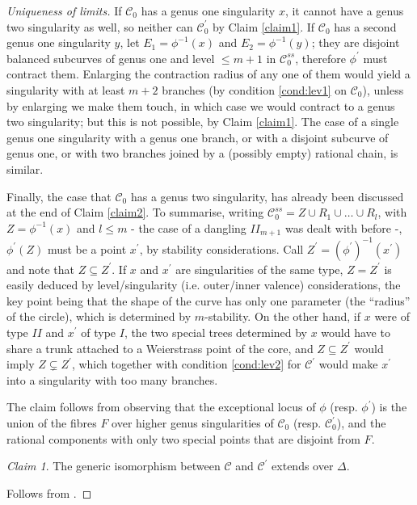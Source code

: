 \documentclass{compositio}
\newcommand{\dvr}{\Delta}
\theoremstyle{plain}
\theoremstyle{definition}
\theoremstyle{remark}
\newtheorem{claim}{Claim}
\begin{document}
\begin{proof}[Uniqueness of limits]
 If $\mathcal C_0$ has a genus one singularity $x$, it cannot have a genus two singularity as well, so neither can $\mathcal C^\prime_0$ by Claim \ref{claim1}. If $\mathcal C_0$ has a second genus one singularity $y$, let $E_1=\phi^{-1}(x)$ and $E_2=\phi^{-1}(y)$; they are disjoint balanced subcurves of genus one and level $\leq m+1$ in $\mathcal C^{ss}_0$, therefore $\phi^\prime$ must contract them. Enlarging the contraction radius of any one of them would yield a singularity with at least $m+2$ branches (by condition \eqref{cond:lev1} on $\mathcal C_0$), unless by enlarging we make them touch, in which case we would contract to a genus two singularity; but this is not possible, by Claim \ref{claim1}. The case of a single genus one singularity with a genus one branch, or with a disjoint subcurve of genus one, or with two branches joined by a (possibly empty) rational chain, is similar.
 
 Finally, the case that $\mathcal C_0$ has a genus two singularity, has already been discussed at the end of Claim \ref{claim2}. To summarise, writing $\mathcal C^{ss}_0=Z\cup R_1\cup\ldots\cup R_l$, with $Z=\phi^{-1}(x)$ and $l\leq m$ - the case of a dangling $I\!I_{m+1}$ was dealt with before -, $\phi^\prime(Z)$ must be a point $x^\prime$, by stability considerations. Call $Z^\prime=(\phi^\prime)^{-1}(x^\prime)$ and note that $Z\subseteq Z^\prime$. If $x$ and $x^\prime$ are singularities of the same type, $Z=Z^\prime$ is easily deduced by level/singularity (i.e. outer/inner valence) considerations, the key point being that the shape of the curve has only one parameter (the ``radius'' of the circle), which is determined by $m$-stability. On the other hand, if $x$ were of type $I\!I$ and $x^\prime$ of type $I$, the two special trees determined by $x$ would have to share a trunk attached to a Weierstrass point of the core, and $Z\subseteq Z^\prime$ would imply $Z\subsetneq Z^\prime$, which together with condition \eqref{cond:lev2} for $\mathcal C^\prime$ would make $x^\prime$ into a singularity with too many branches.
 
 The claim follows from observing that the exceptional locus of $\phi$ (resp. $\phi^\prime$) is the union of the fibres $F$ over higher genus singularities of $\mathcal C_0$ (resp. $\mathcal C_0^\prime$), and the rational components with only two special points that are disjoint from $F$.
 
 \begin{claim} The generic isomorphism between $\mathcal C$ and $\mathcal C^\prime$ extends over $\dvr$.\end{claim}
 
 Follows from \cite[Lemma 1.13]{Debarre}.
\end{proof}
\end{document}
